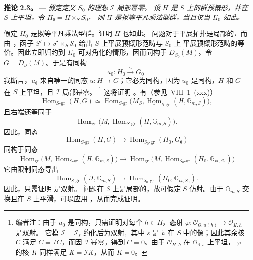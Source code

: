 \medskip
\noindent{}%
\textbf{推论 2.3。} ---
\textit{假定定义 \(S_0\) 的理想 \(\mathscr I\) 局部幂零。
设 \(H\) 是 \(S\) 上的群预概形，并在 \(S\) 上平坦，令 \(H_0=H\times_S S_0\)。
则 \(H\) 是拟等平凡乘法型群，当且仅当 \(H_0\) 如此。}

假定 \(H_0\) 是拟等平凡乘法型群。证明 \(H\) 也如此。
问题对于平展拓扑是局部的，而由 ，函子
\(S'\mapsto S'\times_S S_0\) 给出 \(S\) 上平展预概形范畴与 \(S_0\) 上
平展预概形范畴的等价。因此立即归约到 \(H_0\) 可对角化的情形，因而同构于
\(D_{S_0}(M)\)。令 \(G=D_S(M)\)。于是有同构
\[
  u_0:H_0\xrightarrow{\sim}G_0.
\]
我断言，\(u_0\) 来自唯一的同态 \(u:H\to G\)；它必为同构，因为
\(u_0\) 是同构，\(H\) 和 \(G\) 在 \(S\) 上平坦，且 \(\mathscr I\) 局部幂零。
\footnote{编者注：由于 \(u_0\) 是同构，只需证明对每个 \(h\in H\)，态射
\(\varphi:\mathscr O_{G,u(h)}\to\mathscr O_{H,h}\) 是双射。
它模 \(\mathscr I=\mathscr I_s\) 约化后为双射，其中 \(s\) 是 \(h\) 在
\(S\) 中的像；因此其余核 \(C\) 满足 \(C=\mathscr IC\)，而因 \(\mathscr I\)
幂零，得到 \(C=0\)。由于 \(\mathscr O_{H,h}\) 在 \(\mathscr O_{S,s}\) 上平坦，
\(\varphi\) 的核 \(K\) 同样满足 \(K=\mathscr IK\)，从而 \(K=0\)。}
这将证明 。有（参见\ VIII~1~(xxx)）
\[
  \operatorname{Hom}_{S\text{-}\mathrm{gr}}(H,G)
  \simeq
  \operatorname{Hom}_{S\text{-}\mathrm{gr}}
  \bigl(M_S,
    \underline{\operatorname{Hom}}_{S\text{-}\mathrm{gr}}
      (H,\mathbb G_{m,S})\bigr),
\]
且右端还等同于
\[
  \operatorname{Hom}_{\mathrm{gr}}
  \bigl(M,
    \operatorname{Hom}_{S\text{-}\mathrm{gr}}
      (H,\mathbb G_{m,S})\bigr).
\]
因此，同态
\begin{equation}
  \operatorname{Hom}_{S\text{-}\mathrm{gr}}(H,G)
  \longrightarrow
  \operatorname{Hom}_{S_0\text{-}\mathrm{gr}}(H_0,G_0)
  \tag{x}\label{sga3:x:corollary:2-3:equation:x}
\end{equation}
同构于同态
\[
  \operatorname{Hom}_{\mathrm{gr}}
  \bigl(M,\operatorname{Hom}_{S\text{-}\mathrm{gr}}
    (H,\mathbb G_{m,S})\bigr)
  \longrightarrow
  \operatorname{Hom}_{\mathrm{gr}}
  \bigl(M,\operatorname{Hom}_{S_0\text{-}\mathrm{gr}}
    (H_0,\mathbb G_{m,S_0})\bigr)
\]
它由限制同态导出
\begin{equation}
  \operatorname{Hom}_{S\text{-}\mathrm{gr}}(H,\mathbb G_{m,S})
  \longrightarrow
  \operatorname{Hom}_{S_0\text{-}\mathrm{gr}}
    (H_0,\mathbb G_{m,S_0}).
  \tag{xx}\label{sga3:x:corollary:2-3:equation:xx}
\end{equation}
因此，只需证明  是双射。
问题在 \(S\) 上是局部的，故可假定 \(S\) 仿射。由于 \(\mathbb G_{m,S}\)
交换且在 \(S\) 上平滑，可以应用 ，从而完成证明。

